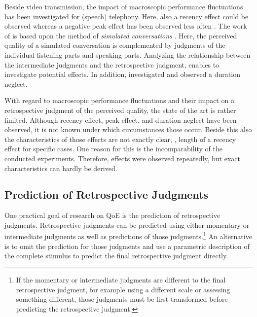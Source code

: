 Beside video transmission, the impact of macroscopic performance fluctuations has been investigated for (speech) telephony. %
Here, also a recency effect could be observed \citep[\eg,][]{rosenbluth_testing_1998, hamberg_time-varying_1999, gros_instantaneous_2001, gros_effects_2004, belmudez_audiovisual_2015, weiss_modeling_2009, lewcio_management_2014} whereas a negative peak effect has been observed less often \citep[\eg,][]{weiss_modeling_2009, belmudez_audiovisual_2015, lewcio_management_2014}.
The work of \citet{weiss_modeling_2009, lewcio_management_2014, belmudez_audiovisual_2015} is based upon the method of \emph{simulated conversations} \citep{etsi_speech_2011}.
Here, the perceived quality of a simulated conversation is complemented by judgments of the individual listening parts and speaking parts.
Analyzing the relationship between the intermediate judgments and the retrospective judgment, enables to investigate potential effects.
In addition, \citet{rosenbluth_testing_1998} investigated and observed a duration neglect.

With regard to macroscopic performance fluctuations and their impact on a retrospective judgment of the perceived quality, the state of the art is rather limited.
Although recency effect, peak effect, and duration neglect have been observed, it is not known under which circumstances those occur.
Beside this also the characteristics of those effects are not exactly clear, \eg, length of a recency effect for specific cases.
One reason for this is the incomparability of the conducted experiments.
Therefore, effects were observed repeatedly, but exact characteristics can hardly be derived.

\subsection{Prediction of Retrospective Judgments}
One practical goal of research on \ac{QoE} is the prediction of retrospective judgments.
Retrospective judgments can be predicted using either momentary or intermediate judgments as well as predictions of those judgments.\footnote{If the momentary or intermediate judgments are different to the final retrospective judgment, for example using a different scale or assessing something different, those judgments must be first transformed before predicting the retrospective judgment.}
An alternative is to omit the prediction for those judgments and use a parametric description of the complete stimulus to predict the final retrospective judgment directly.

